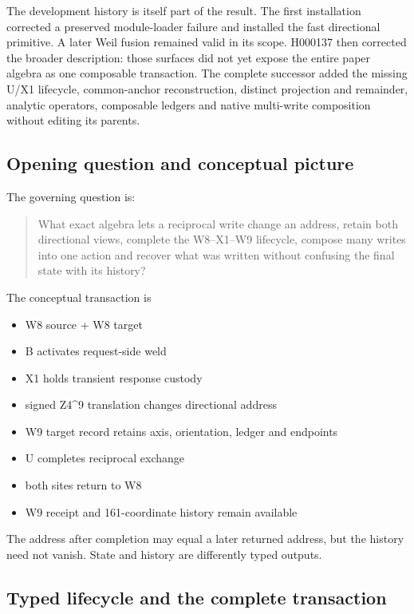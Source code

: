The development history is itself part of the result. The first
installation corrected a preserved module-loader failure and installed
the fast directional primitive. A later Weil fusion remained valid in
its scope. H000137 then corrected the broader description: those
surfaces did not yet expose the entire paper algebra as one composable
transaction. The complete successor added the missing U/X1 lifecycle,
common-anchor reconstruction, distinct projection and remainder,
analytic operators, composable ledgers and native multi-write
composition without editing its parents.

\subsection{Opening question and conceptual
picture}\label{viii-ch04-opening-question-and-conceptual-picture}

The governing question is:

\begin{quote}
What exact algebra lets a reciprocal write change an address, retain
both directional views, complete the W8--X1--W9 lifecycle, compose many
writes into one action and recover what was written without confusing
the final state with its history?
\end{quote}

The conceptual transaction is

\begin{itemize}
\tightlist
\item
  W8 source + W8 target
\item
  B activates request-side weld
\item
  X1 holds transient response custody
\item
  signed Z4\^{}9 translation changes directional address
\item
  W9 target record retains axis, orientation, ledger and endpoints
\item
  U completes reciprocal exchange
\item
  both sites return to W8
\item
  W9 receipt and 161-coordinate history remain available
\end{itemize}

The address after completion may equal a later returned address, but the
history need not vanish. State and history are differently typed
outputs.

\subsection{Typed lifecycle and the complete
transaction}\label{viii-ch04-typed-lifecycle-and-the-complete-transaction}

